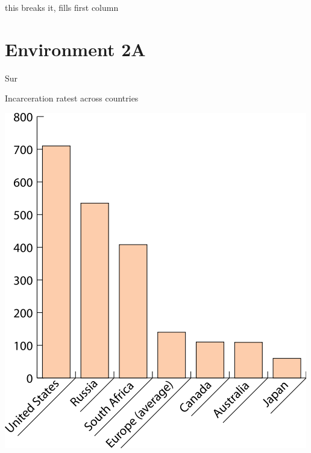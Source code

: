 \lipsum[1-4]
\lipsum[1-5] this breaks it, fills first column



\section{Environment 2A}


\begin{chart}{S}{ur}
\caption{Incarceration ratest across countries}
\label{chart:incarceration}
\includegraphics[width=\chartwidth,height=\chartheight]{incarceration}  
\end{chart}


